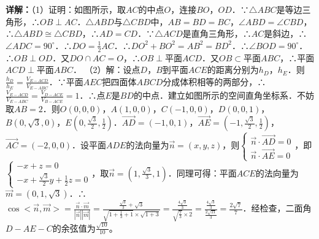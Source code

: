 \begin{question}[points=12]
\begin{solution}
\textbf{详解：}（1）证明：如图所示，取$AC$的中点$O$，连接$BO$，$OD$．∵$\triangle ABC$是等边三角形，∴$OB\perp AC$．$\triangle ABD$与$\triangle CBD$中，$AB=BD=BC$，$\angle ABD=\angle CBD$，∴$\triangle ABD\cong\triangle CBD$，∴$AD=CD$．∵$\triangle ACD$是直角三角形，∴$AC$是斜边，∴$\angle ADC=90^\circ$．∴$DO=\frac{1}{2}AC$．∴$DO^2+BO^2=AB^2=BD^2$．∴$\angle BOD=90^\circ$．∴$OB\perp OD$．又$DO\cap AC=O$，∴$OB\perp$平面$ACD$．又$OB\subset$平面$ABC$，∴平面$ACD\perp$平面$ABC$．
（2）解：设点$D$，$B$到平面$ACE$的距离分别为$h_D$，$h_E$．则$\frac{h_D}{h_E}=\frac{V_{E-ACD}}{V_{E-ABC}}$．∵平面$AEC$把四面体$ABCD$分成体积相等的两部分，∴$\frac{V_{E-ACD}}{V_{E-ABC}}=\frac{V_{D-ACE}}{V_{B-ACE}}=1$．∴点$E$是$BD$的中点．建立如图所示的空间直角坐标系．不妨取$AB=2$．则$O(0,0,0)$，$A(1,0,0)$，$C(-1,0,0)$，$D(0,0,1)$，$B(0,\sqrt{3},0)$，$E(0,\frac{\sqrt{3}}{2},\frac{1}{2})$．$\overrightarrow{AD}=(-1,0,1)$，$\overrightarrow{AE}=(-1,\frac{\sqrt{3}}{2},\frac{1}{2})$，$\overrightarrow{AC}=(-2,0,0)$．设平面$ADE$的法向量为$\overrightarrow{n}=(x,y,z)$，则$\begin{cases} \overrightarrow{n}\cdot\overrightarrow{AD}=0 \\ \overrightarrow{n}\cdot\overrightarrow{AE}=0 \end{cases}$，即$\begin{cases} -x+z=0 \\ -x+\frac{\sqrt{3}}{2}y+\frac{1}{2}z=0 \end{cases}$，取$\overrightarrow{n}=(1,\frac{\sqrt{3}}{3},1)$．同理可得：平面$ACE$的法向量为$\overrightarrow{m}=(0,1,\sqrt{3})$．∴$\cos<\overrightarrow{n},\overrightarrow{m}>=\frac{\overrightarrow{n}\cdot\overrightarrow{m}}{|\overrightarrow{n}||\overrightarrow{m}|}=\frac{\frac{\sqrt{3}}{3}+\sqrt{3}}{\sqrt{1+\frac{1}{3}+1}\times\sqrt{1+3}}=\frac{\frac{4\sqrt{3}}{3}}{\sqrt{\frac{7}{3}}\times2}=\frac{\frac{4\sqrt{3}}{3}}{\frac{2\sqrt{21}}{3}}=\frac{2\sqrt{7}}{7}$．经检查，二面角$D-AE-C$的余弦值为$\frac{\sqrt{10}}{10}$。
\end{solution}
\end{question}

